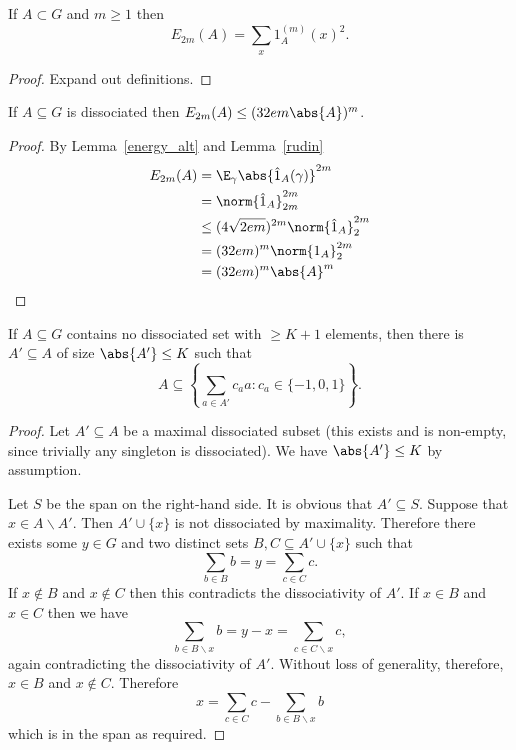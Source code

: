 \begin{lemma}
\label{energy_alt}
\leanok
If $A\subset G$ and $m\geq 1$ then
\[E_{2m}(A) = \sum_x 1_A^{(m)}(x)^2.\]
\end{lemma}

\begin{proof}
\leanok
Expand out definitions.
\end{proof}


\begin{lemma}
\label{diss_energy}
\leanok
If $A\subseteq G$ is dissociated then $E_{2m}(A) \le (32e m \abs{A})^m$.
\end{lemma}
\begin{proof}
\leanok
By Lemma~\ref{energy_alt} and Lemma~\ref{rudin}
\begin{align*}
  E_{2m}(A)
  & = \E_\gamma \abs{\hat 1_A(\gamma)}^{2m} \\
  & = \norm{\hat 1_A}_{2m}^{2m} \\
  & \le (4\sqrt{2em})^{2m} \norm{\hat 1_A}_2^{2m} \\
  & = (32em)^m \norm{1_A}_2^{2m} \\
  & = (32em)^m \abs{A}^m
\end{align*}
\end{proof}


\begin{lemma}
  \label{diss_span}
  \leanok

  If $A\subseteq G$ contains no dissociated set with $\geq K+1$ elements,
  then there is $A'\subseteq A$ of size $\abs{A'}\le K$ such that
  \[A\subseteq \left\{ \sum_{a\in A'}c_aa : c_a\in \{-1,0,1\} \right\}.\]
\end{lemma}

\begin{proof}
\leanok
Let $A'\subseteq A$ be a maximal dissociated subset (this exists and is non-empty, since trivially any singleton is dissociated). We have $\abs{A'}\le K$ by assumption.

Let $S$ be the span on the right-hand side. It is obvious that $A'\subseteq S$. Suppose that $x\in A\backslash A'$. Then $A'\cup\{x\}$ is not dissociated by maximality. Therefore there exists some $y\in G$ and two distinct sets $B,C\subseteq A'\cup \{x\}$ such that
\[\sum_{b\in B}b = y = \sum_{c\in C} c.\]
If $x\not\in B$ and $x\not\in C$ then this contradicts the dissociativity of $A'$. If $x\in B$ and $x\in C$ then we have
\[\sum_{b\in B\backslash x}b=y-x=\sum_{c\in C\backslash x}c,\]
again contradicting the dissociativity of $A'$. Without loss of generality, therefore, $x\in B$ and $x\not\in C$. Therefore
\[x=\sum_{c\in C}c - \sum_{b\in B\backslash x}b\]
which is in the span as required.
\end{proof}


